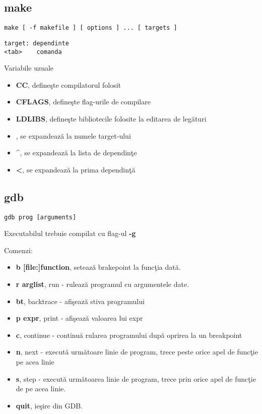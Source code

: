 \documentclass{refcard.cs.pub.ro}
\begin{document}
\begin{multicols*}{3}
\subsection{make}
\begin{verbatim}make [ -f makefile ] [ options ] ... [ targets ]
\end{verbatim}
\begin{verbatim}
target: dependinte
<tab>    comanda
\end{verbatim}
Variabile uzuale
\begin{itemize}
\item \textbf{CC}, defineşte compilatorul folosit
\item \textbf{CFLAGS}, defineşte flag-urile de compilare
\item \textbf{LDLIBS}, defineşte bibliotecile folosite la editarea de legături
\item \textbf{\textdollar@}, se expandează la numele target-ului
\item \textbf{\textdollar\textasciicircum}, se expandează la lista de dependinţe
\item \textbf{\textdollar\textless}, se expandează la prima dependinţă
\end{itemize}

\subsection{gdb}
\begin{verbatim}gdb prog [arguments] 
\end{verbatim}
Executabilul trebuie compilat cu flag-ul \textbf{-g}

Comenzi:
\begin{itemize}
\item \textbf{b [file:]function}, setează brakepoint la funcţia dată.
\item \textbf{r arglist}, run - rulează programul cu argumentele date.
\item \textbf{bt}, backtrace - afişează stiva programului
\item \textbf{p expr}, print - afişează valoarea lui expr 
\item \textbf{c}, continue - continuă rularea programului după oprirea la un breakpoint
\item \textbf{n}, next - execută următoare linie de program, trece peste orice apel de funcţie pe acea linie 
\item \textbf{s}, step - execută următoarea linie de program, trece prin orice apel de funcţie de pe acea linie.
\item \textbf{quit}, ieşire din GDB.
\end{itemize}

\end{multicols*}
\end{document}
